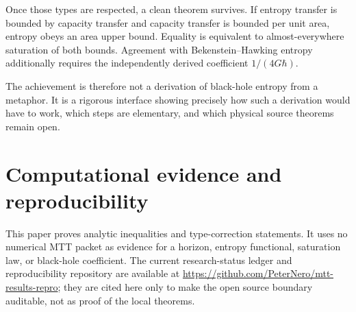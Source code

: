 \documentclass[11pt,a4paper]{article}
\numberwithin{equation}{section}
\theoremstyle{definition}
\theoremstyle{remark}
\begin{document}
Once those types are respected, a clean theorem survives.  If entropy
transfer is bounded by capacity transfer and capacity transfer is bounded
per unit area, entropy obeys an area upper bound.  Equality is equivalent
to almost-everywhere saturation of both bounds.  Agreement with
Bekenstein--Hawking entropy additionally requires the independently
derived coefficient \(1/(4G\hbar)\).

The achievement is therefore not a derivation of black-hole entropy from
a metaphor.  It is a rigorous interface showing precisely how such a
derivation would have to work, which steps are elementary, and which
physical source theorems remain open.

\section*{Computational evidence and reproducibility}

This paper proves analytic inequalities and type-correction statements.
It uses no numerical MTT packet as evidence for a horizon, entropy
functional, saturation law, or black-hole coefficient.  The current
research-status ledger and reproducibility repository are available at
\url{https://github.com/PeterNero/mtt-results-repro}; they are cited here
only to make the open source boundary auditable, not as proof of the local
theorems.

\begingroup
\small


\endgroup
\end{document}
